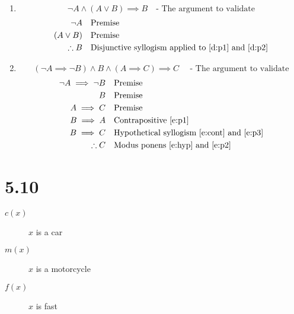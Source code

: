 \documentclass{article}
\begin{document}
\begin{enumerate}[label=\alph*)]
\item
\setcounter{equation}{0}
\[
\neg A \land (A \lor B) \implies B \quad \text{- The argument to validate}
\]
\begin{align}
\label{d:p1}    \neg A                         & \quad \text{Premise} \\
\label{d:p2}    (A \lor B)                     & \quad \text{Premise} \\
                \therefore B                   & \quad \text{Disjunctive syllogism applied to \ref{d:p1} and \ref{d:p2}}
\end{align}

\item
\setcounter{equation}{0}

\[ 
(\neg A \implies \neg B) \land B \land (A \implies C) \implies C \quad \text{ - The argument to validate}
\]
\begin{align}
\label{e:p1}     \neg A \implies \neg B & \quad \text{Premise} \\
\label{e:p2}     B                      & \quad \text{Premise} \\
\label{e:p3}     A \implies C           & \quad \text{Premise} \\
\label{e:cont}   B \implies A           & \quad \text{Contrapositive \ref{e:p1}} \\
\label{e:hyp}    B \implies C           & \quad \text{Hypothetical syllogism \ref{e:cont} and \ref{e:p3}} \\
                 \therefore C           & \quad \text{Modus ponens \ref{e:hyp} and \ref{e:p2}}
\end{align}

\end{enumerate}

\section*{5.10}
\begin{description}
\item[$c(x)$] $x$ is a car
\item[$m(x)$] $x$ is a motorcycle
\item[$f(x)$] $x$ is fast
\end{description}
\end{document}
